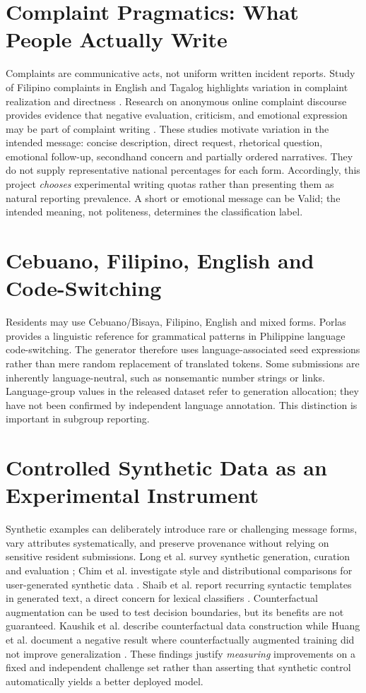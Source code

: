 \section{Complaint Pragmatics: What People Actually Write}
Complaints are communicative acts, not uniform written incident reports. Study of Filipino complaints in English and Tagalog highlights variation in complaint realization and directness \cite{deleon}. Research on anonymous online complaint discourse provides evidence that negative evaluation, criticism, and emotional expression may be part of complaint writing \cite{quimbo}. These studies motivate variation in the intended message: concise description, direct request, rhetorical question, emotional follow-up, secondhand concern and partially ordered narratives. They do not supply representative national percentages for each form. Accordingly, this project \emph{chooses} experimental writing quotas rather than presenting them as natural reporting prevalence. A short or emotional message can be Valid; the intended meaning, not politeness, determines the classification label.

\section{Cebuano, Filipino, English and Code-Switching}
Residents may use Cebuano/Bisaya, Filipino, English and mixed forms. Porlas \cite{porlas} provides a linguistic reference for grammatical patterns in Philippine language code-switching. The generator therefore uses language-associated seed expressions rather than mere random replacement of translated tokens. Some submissions are inherently language-neutral, such as nonsemantic number strings or links. Language-group values in the released dataset refer to generation allocation; they have not been confirmed by independent language annotation. This distinction is important in subgroup reporting.

\section{Controlled Synthetic Data as an Experimental Instrument}
Synthetic examples can deliberately introduce rare or challenging message forms, vary attributes systematically, and preserve provenance without relying on sensitive resident submissions. Long et al. survey synthetic generation, curation and evaluation \cite{long}; Chim et al. investigate style and distributional comparisons for user-generated synthetic data \cite{chim}. Shaib et al. report recurring syntactic templates in generated text, a direct concern for lexical classifiers \cite{shaib}. Counterfactual augmentation can be used to test decision boundaries, but its benefits are not guaranteed. Kaushik et al. describe counterfactual data construction while Huang et al. document a negative result where counterfactually augmented training did not improve generalization \cite{kaushik,huang}. These findings justify \emph{measuring} improvements on a fixed and independent challenge set rather than asserting that synthetic control automatically yields a better deployed model.

